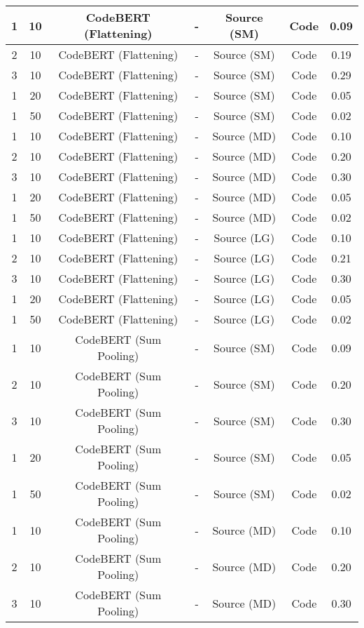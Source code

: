 \begin{longtable}{|c|c|c|c|c|c|c|}
\hline
1 & 10 & CodeBERT (Flattening) & - & Source (SM) & Code & 0.09 \\
\hline
2 & 10 & CodeBERT (Flattening) & - & Source (SM) & Code & 0.19 \\
\hline
3 & 10 & CodeBERT (Flattening) & - & Source (SM) & Code & 0.29 \\
\hline
1 & 20 & CodeBERT (Flattening) & - & Source (SM) & Code & 0.05 \\
\hline
1 & 50 & CodeBERT (Flattening) & - & Source (SM) & Code & 0.02 \\
\hline
1 & 10 & CodeBERT (Flattening) & - & Source (MD) & Code & 0.10 \\
\hline
2 & 10 & CodeBERT (Flattening) & - & Source (MD) & Code & 0.20 \\
\hline
3 & 10 & CodeBERT (Flattening) & - & Source (MD) & Code & 0.30 \\
\hline
1 & 20 & CodeBERT (Flattening) & - & Source (MD) & Code & 0.05 \\
\hline
1 & 50 & CodeBERT (Flattening) & - & Source (MD) & Code & 0.02 \\
\hline
1 & 10 & CodeBERT (Flattening) & - & Source (LG) & Code & 0.10 \\
\hline
2 & 10 & CodeBERT (Flattening) & - & Source (LG) & Code & 0.21 \\
\hline
3 & 10 & CodeBERT (Flattening) & - & Source (LG) & Code & 0.30 \\
\hline
1 & 20 & CodeBERT (Flattening) & - & Source (LG) & Code & 0.05 \\
\hline
1 & 50 & CodeBERT (Flattening) & - & Source (LG) & Code & 0.02 \\
\hline
1 & 10 & CodeBERT (Sum Pooling) & - & Source (SM) & Code & 0.09 \\
\hline
2 & 10 & CodeBERT (Sum Pooling) & - & Source (SM) & Code & 0.20 \\
\hline
3 & 10 & CodeBERT (Sum Pooling) & - & Source (SM) & Code & 0.30 \\
\hline
1 & 20 & CodeBERT (Sum Pooling) & - & Source (SM) & Code & 0.05 \\
\hline
1 & 50 & CodeBERT (Sum Pooling) & - & Source (SM) & Code & 0.02 \\
\hline
1 & 10 & CodeBERT (Sum Pooling) & - & Source (MD) & Code & 0.10 \\
\hline
2 & 10 & CodeBERT (Sum Pooling) & - & Source (MD) & Code & 0.20 \\
\hline
3 & 10 & CodeBERT (Sum Pooling) & - & Source (MD) & Code & 0.30 \\

\end{longtable}
